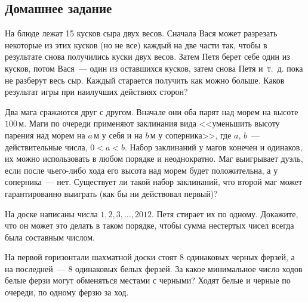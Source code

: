 

\subsection*{Домашнее задание}



\begin{problems}

\item
На блюде лежат 15 кусков сыра двух весов.
Сначала Вася может разрезать некоторые из этих кусков (но не все) каждый на две
части так, чтобы в результате снова получились куски двух весов.
Затем Петя берет себе один из кусков, потом Вася~--- один из оставшихся кусков,
затем снова Петя и~т.~д. пока не разберут весь сыр.
Каждый старается получить как можно больше.
Каков результат игры при наилучших действиях сторон?


\item
Два мага сражаются друг с другом.
Вначале они оба парят над морем на высоте $100\,\text{м}$.
Маги по очереди применяют заклинания вида <<уменьшить высоту парения над морем
на $a\,\text{м}$ у себя и на $b\,\text{м}$ у соперника>>, где $a$, $b$~---
действительные числа, $0 < a < b$.
Набор заклинаний у магов конечен и одинаков, их можно использовать в любом
порядке и неоднократно.
Маг выигрывает дуэль, если после чьего-либо хода его высота над морем будет
положительна, а у соперника~--- нет.
Существует ли такой набор заклинаний, что второй маг может гарантированно
выиграть (как бы ни действовал первый)?

\item
На доске написаны числа $1, 2, 3, \ldots, 2012$.
Петя стирает их по одному.
Докажите, что он может это делать в таком порядке, чтобы сумма нестертых чисел
всегда была составным числом.

\item
На первой горизонтали шахматной доски стоят 8 одинаковых черных ферзей,
а на последней~--- 8 одинаковых белых ферзей.
За какое минимальное число ходов белые ферзи могут обменяться местами
с черными?
Ходят белые и черные по очереди, по одному ферзю за ход.


\end{problems}
